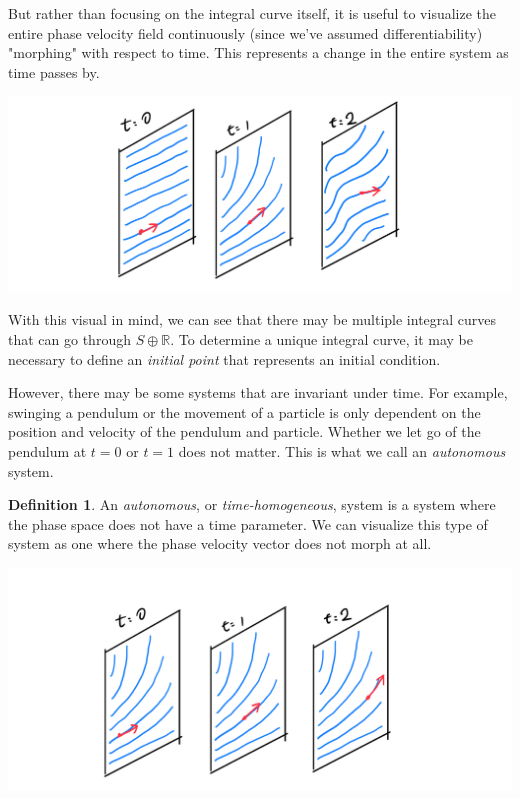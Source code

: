 \documentclass{article}
\theoremstyle{remark}
\theoremstyle{definition}
\newtheorem{definition}{Definition}[section]
\begin{document}
    But rather than focusing on the integral curve itself, it is useful to visualize the entire phase velocity field continuously (since we've assumed differentiability) "morphing" with respect to time. This represents a change in the entire system as time passes by. 
    \begin{center}
    \includegraphics[scale=0.25]{img/Morphing_Field.PNG}
    \end{center}
    With this visual in mind, we can see that there may be multiple integral curves that can go through $S \oplus \mathbb{R}$. To determine a unique integral curve, it may be necessary to define an \textit{initial point} that represents an initial condition. 

    However, there may be some systems that are invariant under time. For example, swinging a pendulum or the movement of a particle is only dependent on the position and velocity of the pendulum and particle. Whether we let go of the pendulum at $t=0$ or $t=1$ does not matter. This is what we call an \textit{autonomous} system. 

    \begin{definition}
    An \textit{autonomous}, or \textit{time-homogeneous}, system is a system where the phase space does not have a time parameter. We can visualize this type of system as one where the phase velocity vector does not morph at all. 
    \begin{center}
        \includegraphics[scale=0.25]{img/Autonomous_Field.PNG}
    \end{center}
    \end{definition}
\end{document}
